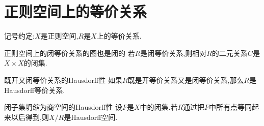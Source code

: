 \section{正则空间上的等价关系}

记号约定:$X$是正则空间,$R$是$X$上的等价关系.

\begin{proposition}{正则空间上的闭等价关系的图也是闭的}{}
	若$R$是闭等价关系,则相对$R$的二元关系$C$是$X\times X$的闭集.
\end{proposition}

\begin{corollary}{既开又闭等价关系的Hausdorff性}{}
	如果$R$既是开等价关系又是闭等价关系,那么$R$是Hausdorff等价关系.
\end{corollary}

\begin{proposition}{闭子集坍缩为商空间的Hausdorff性}{}
	设$F$是$X$中的闭集.若$R$通过把$F$中所有点等同起来以后得到,则$X/R$是Hausdorff空间.
\end{proposition}